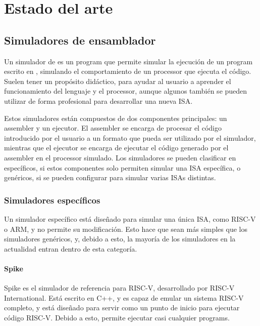 \chapter{Estado del arte}\label{chap:state-of-the-art}

\section{Simuladores de ensamblador}

Un simulador de  es un \gls{program} que permite
simular la ejecución de un \gls{program} escrito en ,
simulando el comportamiento de un \gls{processor} que ejecuta el código. Suelen
tener un propósito didáctico, para ayudar al usuario a aprender el
funcionamiento del lenguaje y el \gls{processor}, aunque algunos también se
pueden utilizar de forma profesional para desarrollar una nueva \gls{ISA}.

Estos simuladores están compuestos de dos componentes principales: un
\gls{assembler} y un ejecutor. El \gls{assembler} se encarga de procesar el
código  introducido por el usuario a un formato
que pueda ser utilizado por el simulador, mientras que el ejecutor se encarga
de ejecutar el código generado por el \gls{assembler} en el \gls{processor}
simulado. Los simuladores se pueden clasificar en específicos, si estos componentes
solo permiten simular una \gls{ISA} específica, o genéricos, si se pueden
configurar para simular varias \glspl{ISA} distintas.

\subsection{Simuladores específicos}

Un simulador específico está diseñado para simular una única \gls{ISA}, como
RISC-V o ARM, y no permite su modificación. Esto hace que sean más simples que
los simuladores genéricos, y, debido a esto, la mayoría de los simuladores en la
actualidad entran dentro de esta categoría.

\subsubsection{Spike}

Spike \parencite{spike} es el simulador de referencia para RISC-V, desarrollado
por RISC-V International. Está escrito en C++, y es capaz de emular un sistema RISC-V completo, y está
diseñado para servir como un punto de inicio para ejecutar código RISC-V. Debido
a esto, permite ejecutar casi cualquier \glspl{program}.

